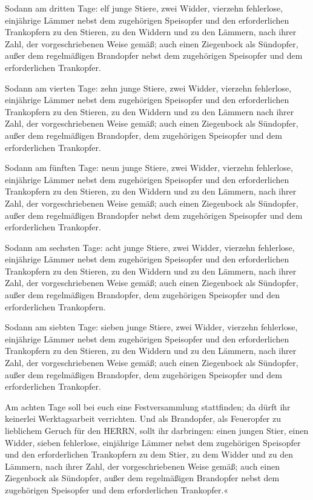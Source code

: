Sodann am dritten Tage: elf junge Stiere, zwei Widder,
vierzehn fehlerlose, einjährige Lämmer nebst dem
zugehörigen Speisopfer und den erforderlichen Trankopfern zu den
Stieren, zu den Widdern und zu den Lämmern, nach ihrer Zahl, der
vorgeschriebenen Weise gemäß; auch einen Ziegenbock als
Sündopfer, außer dem regelmäßigen Brandopfer nebst dem zugehörigen
Speisopfer und dem erforderlichen Trankopfer.

Sodann am vierten Tage: zehn junge Stiere, zwei Widder,
vierzehn fehlerlose, einjährige Lämmer nebst dem
zugehörigen Speisopfer und den erforderlichen Trankopfern zu den
Stieren, zu den Widdern und zu den Lämmern nach ihrer Zahl, der
vorgeschriebenen Weise gemäß; auch einen Ziegenbock als
Sündopfer, außer dem regelmäßigen Brandopfer, dem zugehörigen Speisopfer
und dem erforderlichen Trankopfer.

Sodann am fünften Tage: neun junge Stiere, zwei Widder,
vierzehn fehlerlose, einjährige Lämmer nebst dem
zugehörigen Speisopfer und den erforderlichen Trankopfern zu den
Stieren, zu den Widdern und zu den Lämmern, nach ihrer Zahl, der
vorgeschriebenen Weise gemäß; auch einen Ziegenbock als
Sündopfer, außer dem regelmäßigen Brandopfer nebst dem zugehörigen
Speisopfer und dem erforderlichen Trankopfer.

Sodann am sechsten Tage: acht junge Stiere, zwei Widder,
vierzehn fehlerlose, einjährige Lämmer nebst dem
zugehörigen Speisopfer und den erforderlichen Trankopfern zu den
Stieren, zu den Widdern und zu den Lämmern, nach ihrer Zahl, der
vorgeschriebenen Weise gemäß; auch einen Ziegenbock als
Sündopfer, außer dem regelmäßigen Brandopfer, dem zugehörigen Speisopfer
und den erforderlichen Trankopfern.

Sodann am siebten Tage: sieben junge Stiere, zwei Widder,
vierzehn fehlerlose, einjährige Lämmer nebst dem
zugehörigen Speisopfer und den erforderlichen Trankopfern zu den
Stieren, zu den Widdern und zu den Lämmern, nach ihrer Zahl, der
vorgeschriebenen Weise gemäß; auch einen Ziegenbock als
Sündopfer, außer dem regelmäßigen Brandopfer, dem zugehörigen Speisopfer
und dem erforderlichen Trankopfer.

Am achten Tage soll bei euch eine Festversammlung
stattfinden; da dürft ihr keinerlei Werktagsarbeit verrichten.
Und als Brandopfer, als Feueropfer zu lieblichem Geruch
für den HERRN, sollt ihr darbringen: einen jungen Stier, einen Widder,
sieben fehlerlose, einjährige Lämmer nebst dem
zugehörigen Speisopfer und den erforderlichen Trankopfern zu dem Stier,
zu dem Widder und zu den Lämmern, nach ihrer Zahl, der vorgeschriebenen
Weise gemäß; auch einen Ziegenbock als Sündopfer, außer
dem regelmäßigen Brandopfer nebst dem zugehörigen Speisopfer und dem
erforderlichen Trankopfer.«

